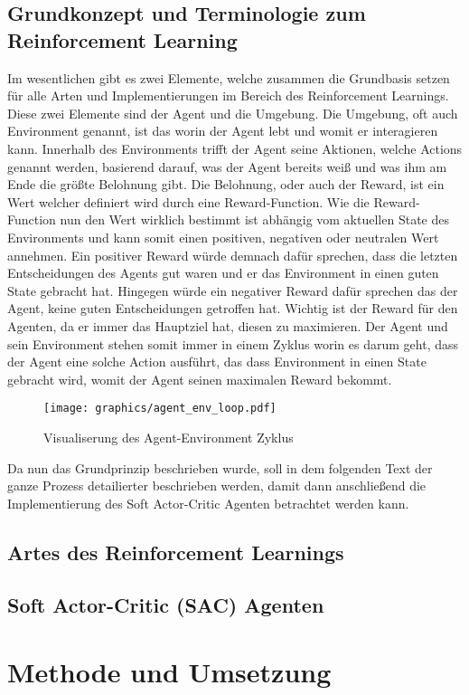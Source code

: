 \documentclass[]{iat}
\begin{document}
\section{Grundkonzept und Terminologie zum Reinforcement Learning}
Im wesentlichen gibt es zwei Elemente, welche zusammen die Grundbasis setzen für alle Arten und Implementierungen im Bereich des Reinforcement Learnings. Diese zwei Elemente sind der Agent und die Umgebung. Die Umgebung, oft auch Environment genannt, ist das worin der Agent lebt und womit er interagieren kann. Innerhalb des Environments trifft der Agent seine Aktionen, welche Actions genannt werden, basierend darauf, was der Agent bereits weiß und was ihm am Ende die größte Belohnung gibt. Die Belohnung, oder auch der Reward, ist ein Wert welcher definiert wird durch eine Reward-Function. Wie die Reward-Function nun den Wert wirklich bestimmt ist abhängig vom aktuellen State des Environments und kann somit einen positiven, negativen oder neutralen Wert annehmen. Ein positiver Reward würde demnach dafür sprechen, dass die letzten Entscheidungen des Agents gut waren und er das Environment in einen guten State gebracht hat. Hingegen würde ein negativer Reward dafür sprechen das der Agent, keine guten Entscheidungen getroffen hat. Wichtig ist der Reward für den Agenten, da er immer das Hauptziel hat, diesen zu maximieren. Der Agent und sein Environment stehen somit immer in einem Zyklus worin es darum geht, dass der Agent eine solche Action ausführt, das dass Environment in einen State gebracht wird, womit der Agent seinen maximalen Reward bekommt.
\begin{figure}[H]
	\texttt{[image: graphics/agent\_env\_loop.pdf]}
	\centering
	\caption{Visualiserung des Agent-Environment Zyklus}
	\label{abb:agent_env_loop}
\end{figure}
Da nun das Grundprinzip beschrieben wurde, soll in dem folgenden Text der ganze Prozess detailierter beschrieben werden, damit dann anschließend die Implementierung des Soft Actor-Critic Agenten betrachtet werden kann.
\section{Artes des Reinforcement Learnings}
\section{Soft Actor-Critic (SAC) Agenten}

\chapter{Methode und Umsetzung}
\end{document}
